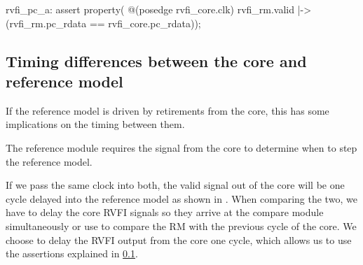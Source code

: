 \begin{systemverilog}[caption={Assertion comparing the PC of the \acrshort{rm} and core.}, label={lst:pc_assertion}]
rvfi_pc_a: assert property( @(posedge rvfi_core.clk)
    rvfi_rm.valid |-> (rvfi_rm.pc_rdata == rvfi_core.pc_rdata));
\end{systemverilog}

\subsection{Timing differences between the core and reference model}

If the reference model is driven by retirements from the core, this has some implications on the timing between them.

The reference module requires the  signal from the core to determine when to step the reference model.


If we pass the same clock into both, the valid signal out of the core will be one cycle delayed into the reference model as shown in . When comparing the two, we have to delay the core RVFI signals so they arrive at the compare module simultaneously or use  to compare the RM with the previous cycle of the core. We choose to delay the RVFI output from the core one cycle, which allows us to use the assertions explained in \ref{}.

